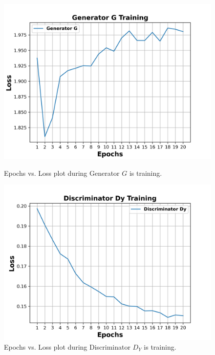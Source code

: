 \begin{figure}[H]
  \centering
  \begin{minipage}[b]{0.49\textwidth}
    \includegraphics[width=\textwidth]{images/Evaluation/GeneratorGTraining.png}
    \caption[Epochs vs. Loss plot during Generator $G$ is training.]{Epochs vs. Loss plot during Generator $G$ is training.}
    \label{fig:generatorG}
  \end{minipage}
  \hfill
  \begin{minipage}[b]{0.49\textwidth}
    \includegraphics[width=\textwidth]{images/Evaluation/DiscriminatorDyTraining.png}
    \caption[Epochs vs. Loss plot during Discriminator $D_Y$ is training.]{Epochs vs. Loss plot during Discriminator $D_Y$ is training.}
    \label{fig:discriminatorDy}
  \end{minipage}
\end{figure}

